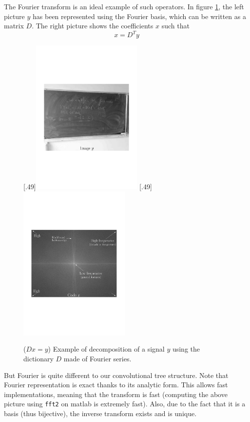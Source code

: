 The Fourier transform is an ideal example of such operators. In figure \ref{explefourier}, the left picture $y$ has been represented using the Fourier basis, which can be written as a matrix $D$. The right picture shows the coefficients $x$ such that
$$x = D^Ty$$
\begin{figure}[!h]
%
  [.49\linewidth]{\includegraphics[width=0.49\textwidth]{figures/exple_fourier_spacial.pdf}}
  [.49\linewidth]{\includegraphics[width=0.49\textwidth]{figures/exple_fourier_frequen.pdf}}
  \caption{ ($Dx=y$) Example of decomposition of a signal $y$ using the dictionary $D$ made of Fourier series.} \label{explefourier}
\end{figure}
But Fourier is quite different to our convolutional tree structure. Note that Fourier representation is exact thanks to its analytic form. This allows fast implementations, meaning that the transform is fast (computing the above picture using \texttt{fft2} on matlab is extremely fast). Also, due to the fact that it is a basis (thus bijective), the inverse transform exists and is unique. %

